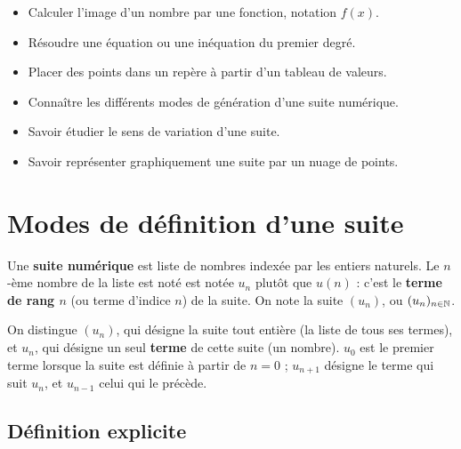 \documentclass[10pt,a4paper]{article}
\begin{document}
\vspace{-0.3cm}

\begin{prerequis}
\begin{itemize}
    \item Calculer l'image d'un nombre par une fonction, notation \(f(x)\).
    \item Résoudre une équation ou une inéquation du premier degré.
    \item Placer des points dans un repère à partir d'un tableau de valeurs.
\end{itemize}
\end{prerequis}

\begin{objectifs}
\begin{itemize}
    \item Connaître les différents modes de génération d'une suite numérique.
    \item Savoir étudier le sens de variation d'une suite.
    \item Savoir représenter graphiquement une suite par un nuage de points.
\end{itemize}
\end{objectifs}

\section{Modes de définition d'une suite}

\begin{defi}
    Une \textbf{suite numérique} est liste de nombres indexée par les entiers naturels. Le \(n\)-ème nombre de la liste est noté est notée \(u_n\) plutôt que \(u(n)\) : c'est le \textbf{terme de rang \(n\)} (ou terme d'indice \(n\)) de la suite. On note la suite \((u_n)\), ou \((u_n)_{n\in\mathbb{N}}\).
\end{defi}

\begin{rem}
    On distingue \((u_n)\), qui désigne la suite tout entière (la liste de tous ses termes), et \(u_n\), qui désigne un seul \textbf{terme} de cette suite (un nombre). \(u_0\) est le premier terme lorsque la suite est définie à partir de \(n=0\) ; \(u_{n+1}\) désigne le terme qui suit \(u_n\), et \(u_{n-1}\) celui qui le précède.
\end{rem}

\subsection{Définition explicite}
\end{document}
